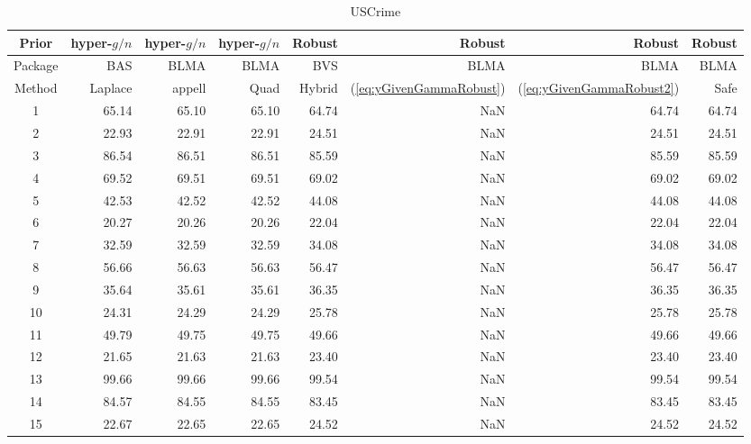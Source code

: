 \begin{table}[ht]
	\centering
		{\small 
	\begin{tabular}{c|rrr|rrrr}
		Prior   & hyper-$g/n$ & hyper-$g/n$ & hyper-$g/n$ & Robust &  Robust & Robust & Robust \\		
		\hline
		Package & BAS         & BLMA        & BLMA        & BVS & BLMA & BLMA & BLMA  \\
		\hline 
		Method  & Laplace     & appell      & Quad  & Hybrid & (\ref{eq:yGivenGammaRobust}) & (\ref{eq:yGivenGammaRobust2}) & Safe \\ 
		\hline
		1 & 65.14 & 65.10 & 65.10 & 64.74 & NaN & 64.74 & 64.74 \\ 
		2 & 22.93 & 22.91 & 22.91 & 24.51 & NaN & 24.51 & 24.51 \\ 
		3 & 86.54 & 86.51 & 86.51 & 85.59 & NaN & 85.59 & 85.59 \\ 
		4 & 69.52 & 69.51 & 69.51 & 69.02 & NaN & 69.02 & 69.02 \\ 
		5 & 42.53 & 42.52 & 42.52 & 44.08 & NaN & 44.08 & 44.08 \\ 
		6 & 20.27 & 20.26 & 20.26 & 22.04 & NaN & 22.04 & 22.04 \\ 
		7 & 32.59 & 32.59 & 32.59 & 34.08 & NaN & 34.08 & 34.08 \\ 
		8 & 56.66 & 56.63 & 56.63 & 56.47 & NaN & 56.47 & 56.47 \\ 
		9 & 35.64 & 35.61 & 35.61 & 36.35 & NaN & 36.35 & 36.35 \\ 
		10 & 24.31 & 24.29 & 24.29 & 25.78 &NaN  & 25.78 & 25.78 \\ 
		11 & 49.79 & 49.75 & 49.75 & 49.66 & NaN & 49.66 & 49.66 \\ 
		12 & 21.65 & 21.63 & 21.63 & 23.40 & NaN & 23.40 & 23.40 \\ 
		13 & 99.66 & 99.66 & 99.66 & 99.54 & NaN & 99.54 & 99.54 \\ 
		14 & 84.57 & 84.55 & 84.55 & 83.45 & NaN & 83.45 & 83.45 \\ 
		15 & 22.67 & 22.65 & 22.65 & 24.52 & NaN & 24.52 & 24.52 \\ 
		\hline
	\end{tabular}
}
	\caption{USCrime}
	\label{tab:USCrimeResults2}
\end{table} 






